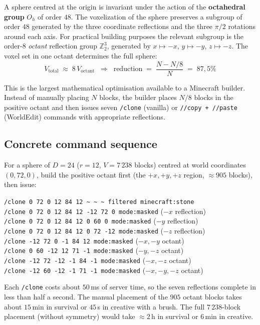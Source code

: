 \documentclass[12pt,a4paper]{scrartcl}
\newcommand{\acc}[1]{\textcolor{accent}{\textbf{#1}}}
\newcommand{\cmd}[1]{\textcolor{earth}{\texttt{\small #1}}}
\begin{document}
A sphere centred at the origin is invariant under the action of the \acc{octahedral group} $O_h$ of order $48$. The voxelization of the sphere preserves a subgroup of order $48$ generated by the three coordinate reflections and the three $\pi/2$ rotations around each axis. For practical building purposes the relevant subgroup is the order-$8$ \emph{octant} reflection group $\mathbb{Z}_2^3$, generated by $x \mapsto -x$, $y \mapsto -y$, $z \mapsto -z$. The voxel set in one octant determines the full sphere:
\[
V_{\mathrm{total}} \;\approx\; 8\,V_{\mathrm{octant}}\;\;\Longrightarrow\;\;
\text{reduction}\;=\;\frac{N - N/8}{N} \;=\; 87{,}5\%
\]

This is the largest mathematical optimisation available to a Minecraft builder. Instead of manually placing $N$ blocks, the builder places $N/8$ blocks in the positive octant and then issues seven \cmd{/clone} (vanilla) or \cmd{//copy + //paste} (WorldEdit) commands with appropriate reflections.

\subsection{Concrete command sequence}
For a sphere of $D=24$ ($r=12$, $V = 7\,238$ blocks) centred at world coordinates $(0,72,0)$, build the positive octant first (the $+x, +y, +z$ region, $\approx 905$ blocks), then issue:

\begin{minec}
\cmd{/clone 0 72 0 12 84 12 \textasciitilde\,\textasciitilde\,\textasciitilde\ filtered minecraft:stone}\\
\cmd{/clone 0 72 0 12 84 12 -12 72 0 mode:masked} \quad (\(-x\) reflection)\\
\cmd{/clone 0 72 0 12 84 12 0 60 0 mode:masked} \quad\quad (\(-y\) reflection)\\
\cmd{/clone 0 72 0 12 84 12 0 72 -12 mode:masked} \quad (\(-z\) reflection)\\
\cmd{/clone -12 72 0 -1 84 12 mode:masked} \quad\quad\quad\;\; (\(-x,-y\) octant)\\
\cmd{/clone 0 60 -12 12 71 -1 mode:masked} \quad\quad\quad (\(-y,-z\) octant)\\
\cmd{/clone -12 72 -12 -1 84 -1 mode:masked} \quad\;\; (\(-x,-z\) octant)\\
\cmd{/clone -12 60 -12 -1 71 -1 mode:masked} \quad\;\; (\(-x,-y,-z\) octant)
\end{minec}

Each \cmd{/clone} costs about $50$\,ms of server time, so the seven reflections complete in less than half a second. The manual placement of the $905$ octant blocks takes about $15$\,min in survival or $45$\,s in creative with a brush. The full $7\,238$-block placement (without symmetry) would take $\approx 2$\,h in survival or $6$\,min in creative.
\end{document}
